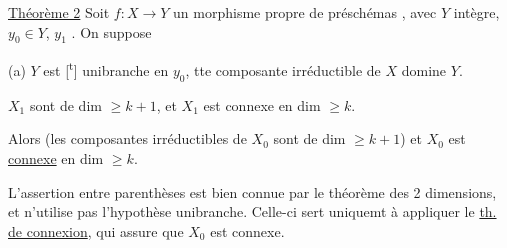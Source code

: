 
\uline{Théorème 2} Soit $f:X\longrightarrow Y$ un morphisme  propre de préschémas  , avec $Y$ intègre, $y_0\in Y$, $y_1$  . On suppose   %

 (a) $Y$ est [\textsuperscript{t}] unibranche en $y_0$,  tte composante irréductible de $X$ domine $Y$.

   $X_1$ sont de dim $\geq k+1$, et $X_1$ est connexe en dim $\geq k$.

Alors (les composantes irréductibles de $X_0$ sont de dim $\geq k+1$) et $X_0$ est \uline{connexe} en dim $\geq k$.

L'assertion entre parenthèses est bien connue par le théorème des 2 dimensions, et n'utilise pas l'hypothèse unibranche. Celle-ci sert uniquemt à appliquer le \uline{th. de connexion}, qui assure que $X_0$ est connexe.

